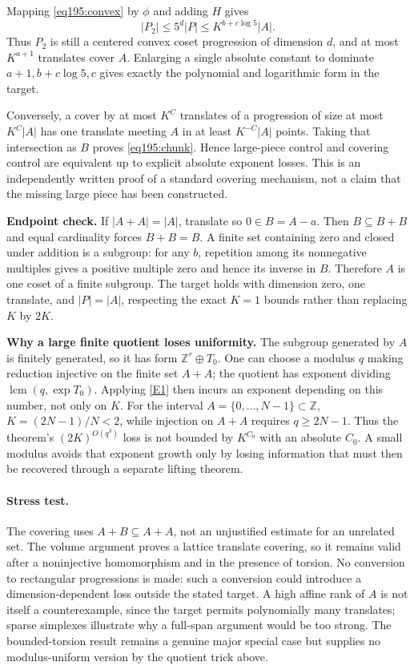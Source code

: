 \documentclass[11pt,a4paper]{article}
\newcommand{\Z}{\mathbb{Z}}
\newcommand{\eref}[2]{\hyperlink{extra:#1:#2}{[E#2]}}
\numberwithin{equation}{section}
\begin{document}
Mapping \eqref{eq195:convex} by $\phi$ and adding $H$ gives
\[
 |P_2|\le5^d|P|\le K^{b+c\log5}|A|.
\]
Thus $P_2$ is still a centered convex coset progression of dimension $d$, and at most $K^{a+1}$ translates cover $A$. Enlarging a single absolute constant to dominate $a+1,b+c\log5,c$ gives exactly the polynomial and logarithmic form in the target.

Conversely, a cover by at most $K^C$ translates of a progression of size at most $K^C|A|$ has one translate meeting $A$ in at least $K^{-C}|A|$ points. Taking that intersection as $B$ proves \eqref{eq195:chunk}. Hence large-piece control and covering control are equivalent up to explicit absolute exponent losses. This is an independently written proof of a standard covering mechanism, not a claim that the missing large piece has been constructed.

\textbf{Endpoint check.} If $|A+A|=|A|$, translate so $0\in B=A-a$. Then $B\subseteq B+B$ and equal cardinality forces $B+B=B$. A finite set containing zero and closed under addition is a subgroup: for any $b$, repetition among its nonnegative multiples gives a positive multiple zero and hence its inverse in $B$. Therefore $A$ is one coset of a finite subgroup. The target holds with dimension zero, one translate, and $|P|=|A|$, respecting the exact $K=1$ bounds rather than replacing $K$ by $2K$.

\textbf{Why a large finite quotient loses uniformity.} The subgroup generated by $A$ is finitely generated, so it has form $\Z^r\oplus T_0$. One can choose a modulus $q$ making reduction injective on the finite set $A+A$; the quotient has exponent dividing $\operatorname{lcm}(q,\exp T_0)$. Applying \eref{30006785}{1} then incurs an exponent depending on this number, not only on $K$. For the interval $A=\{0,\ldots,N-1\}\subset\Z$, $K=(2N-1)/N<2$, while injection on $A+A$ requires $q\ge2N-1$. Thus the theorem's $(2K)^{O(q^3)}$ loss is not bounded by $K^{C_0}$ with an absolute $C_0$. A small modulus avoids that exponent growth only by losing information that must then be recovered through a separate lifting theorem.

\paragraph{Stress test.}
The covering uses $A+B\subseteq A+A$, not an unjustified estimate for an unrelated set. The volume argument proves a lattice translate covering, so it remains valid after a noninjective homomorphism and in the presence of torsion. No conversion to rectangular progressions is made: such a conversion could introduce a dimension-dependent loss outside the stated target. A high affine rank of $A$ is not itself a counterexample, since the target permits polynomially many translates; sparse simplexes illustrate why a full-span argument would be too strong. The bounded-torsion result remains a genuine major special case but supplies no modulus-uniform version by the quotient trick above.
\end{document}
